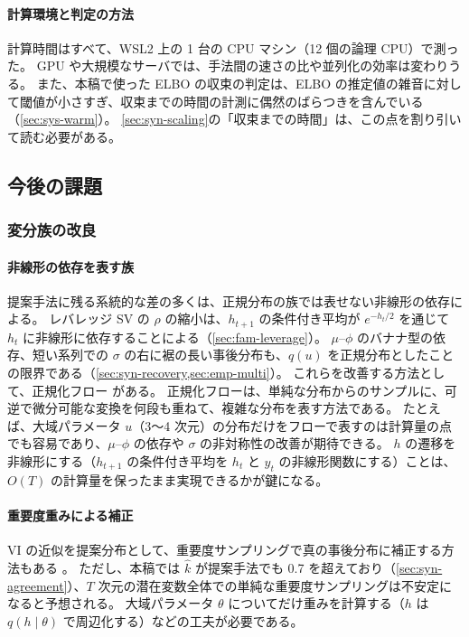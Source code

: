 \paragraph{計算環境と判定の方法}
計算時間はすべて、WSL2 上の 1 台の CPU マシン（12 個の論理 CPU）で測った。
GPU や大規模なサーバでは、手法間の速さの比や並列化の効率は変わりうる。
また、本稿で使った ELBO の収束の判定は、ELBO の推定値の雑音に対して閾値が小さすぎ、収束までの時間の計測に偶然のばらつきを含んでいる（\cref{sec:sys-warm}）。
\cref{sec:syn-scaling}の「収束までの時間」は、この点を割り引いて読む必要がある。

\subsection{今後の課題}\label{sec:conc-future}

\subsubsection{変分族の改良}

\paragraph{非線形の依存を表す族}
提案手法に残る系統的な差の多くは、正規分布の族では表せない非線形の依存による。
レバレッジ SV の $\rho$ の縮小は、$h_{t+1}$ の条件付き平均が $e^{-h_t/2}$ を通じて $h_t$ に非線形に依存することによる（\cref{sec:fam-leverage}）。
$\mu$–$\phi$ のバナナ型の依存、短い系列での $\sigma$ の右に裾の長い事後分布も、$q(u)$ を正規分布としたことの限界である（\cref{sec:syn-recovery,sec:emp-multi}）。
これらを改善する方法として、正規化フロー \parencite{rezende2015,kingma2016}がある。
正規化フローは、単純な分布からのサンプルに、可逆で微分可能な変換を何段も重ねて、複雑な分布を表す方法である。
たとえば、大域パラメータ $u$（3〜4 次元）の分布だけをフローで表すのは計算量の点でも容易であり、$\mu$–$\phi$ の依存や $\sigma$ の非対称性の改善が期待できる。
$h$ の遷移を非線形にする（$h_{t+1}$ の条件付き平均を $h_t$ と $y_t$ の非線形関数にする）ことは、$O(T)$ の計算量を保ったまま実現できるかが鍵になる。

\paragraph{重要度重みによる補正}
VI の近似を提案分布として、重要度サンプリングで真の事後分布に補正する方法もある \parencite{tan2020}。
ただし、本稿では $\hat k$ が提案手法でも 0.7 を超えており（\cref{sec:syn-agreement}）、$T$ 次元の潜在変数全体での単純な重要度サンプリングは不安定になると予想される。
大域パラメータ $\theta$ についてだけ重みを計算する（$h$ は $q(h \mid \theta)$ で周辺化する）などの工夫が必要である。

